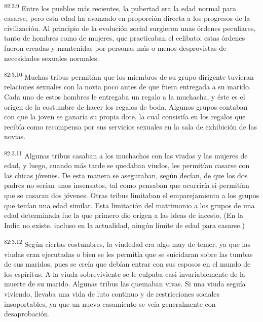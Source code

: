 \par
\textsuperscript{82:3.9} Entre los pueblos más recientes, la pubertad era la edad normal para casarse, pero esta edad ha avanzado en proporción directa a los progresos de la civilización. Al principio de la evolución social surgieron unas órdenes peculiares, tanto de hombres como de mujeres, que practicaban el celibato; estas órdenes fueron creadas y mantenidas por personas más o menos desprovistas de necesidades sexuales normales.

\par
\textsuperscript{82:3.10} Muchas tribus permitían que los miembros de su grupo dirigente tuvieran relaciones sexuales con la novia poco antes de que fuera entregada a su marido. Cada uno de estos hombres le entregaba un regalo a la muchacha, y éste es el origen de la costumbre de hacer los regalos de boda. Algunos grupos contaban con que la joven se ganaría su propia dote, la cual consistía en los regalos que recibía como recompensa por sus servicios sexuales en la sala de exhibición de las novias.

\par
\textsuperscript{82:3.11} Algunas tribus casaban a los muchachos con las viudas y las mujeres de edad, y luego, cuando más tarde se quedaban viudos, les permitían casarse con las chicas jóvenes. De esta manera se aseguraban, según decían, de que los dos padres no serían unos insensatos, tal como pensaban que ocurriría si permitían que se casaran dos jóvenes. Otras tribus limitaban el emparejamiento a los grupos que tenían una edad similar. Esta limitación del matrimonio a los grupos de una edad determinada fue la que primero dio origen a las ideas de incesto. (En la India no existe, incluso en la actualidad, ningún límite de edad para casarse.)

\par
\textsuperscript{82:3.12} Según ciertas costumbres, la viudedad era algo muy de temer, ya que las viudas eran ejecutadas o bien se les permitía que se suicidaran sobre las tumbas de sus maridos, pues se creía que debían entrar con sus esposos en el mundo de los espíritus. A la viuda sobreviviente se le culpaba casi invariablemente de la muerte de su marido. Algunas tribus las quemaban vivas. Si una viuda seguía viviendo, llevaba una vida de luto continuo y de restricciones sociales insoportables, ya que un nuevo casamiento se veía generalmente con desaprobación.

